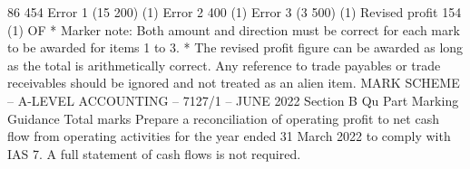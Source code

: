 \documentclass{article}
\begin{document}
86 454    \newline
Error 1 \newline
(15 200) (1)  \newline
Error 2  400 \newline
(1) \newline
Error 3 \newline
(3 500) (1) \newline
Revised profit  154 \newline
(1) OF * \newline
 \newline
Marker note: \newline
 \newline
Both amount and direction must be correct for each mark to be awarded for items 1 to 3. \newline
 \newline
* The revised profit figure can be awarded as long as the total is arithmetically correct.  Any reference to \newline
trade payables or trade receivables should be ignored and not treated as an alien item. \newline
 \newline
 \newline
 \newline
 \newline
 \newline
MARK SCHEME – A-LEVEL ACCOUNTING – 7127/1 – JUNE 2022  \newline
Section B \newline
 \newline
Qu \newline
Part \newline
Marking Guidance \newline
Total \newline
marks   \newline
Prepare a reconciliation of operating profit to net cash flow from operating \newline
activities for the year ended 31 March 2022 to comply with IAS 7. \newline
A full statement of cash flows is not required.  \newline
 \newline
\end{document}
